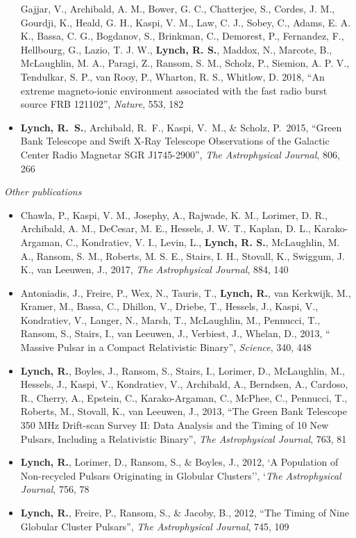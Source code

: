 \documentclass[10pt]{NSF}
\begin{document}
\begin{itemize}
{  Gajjar, V., Archibald, A. M., Bower, G. C., Chatterjee, S., Cordes,
  J. M., Gourdji, K., Heald, G. H., Kaspi, V. M., Law, C. J., Sobey,
  C., Adams, E. A. K., Bassa, C. G., Bogdanov, S., Brinkman, C.,
  Demorest, P., Fernandez, F., Hellbourg, G., Lazio, T. J. W.,
  \textbf{Lynch, R. S.}, Maddox, N., Marcote, B., McLaughlin, M. A.,
  Paragi, Z., Ransom, S. M., Scholz, P., Siemion, A. P. V., Tendulkar,
  S. P., van Rooy, P., Wharton, R. S., Whitlow, D. 2018, ``An extreme
  magneto-ionic environment associated with the fast radio burst
  source FRB 121102'', \emph{Nature}, 553, 182}
\item{\textbf{Lynch, R.~S.}, Archibald, R.~F., Kaspi, V.~M., \&
  Scholz, P.\ 2015, ``Green Bank Telescope and Swift X-Ray Telescope
  Observations of the Galactic Center Radio Magnetar SGR J1745-2900'',
  \emph{The Astrophysical Journal}, 806, 266}
\end{itemize}

\textit{Other publications}
\vspace{-1em}
\begin{itemize}
\item{Chawla, P., Kaspi, V. M., Josephy, A., Rajwade, K. M., Lorimer,
  D. R., Archibald, A. M., DeCesar, M. E., Hessels, J. W. T., Kaplan,
  D. L., Karako-Argaman, C., Kondratiev, V. I., Levin, L.,
  \textbf{Lynch, R. S.}, McLaughlin, M. A., Ransom, S. M., Roberts,
  M. S. E., Stairs, I. H., Stovall, K., Swiggum, J. K., van Leeuwen,
  J., 2017, \emph{The Astrophysical Journal}, 884, 140}
\item{Antoniadis, J., Freire, P., Wex, N., Tauris, T., \textbf{Lynch,
    R.}, van Kerkwijk, M., Kramer, M., Bassa, C., Dhillon, V., Driebe,
  T., Hessels, J., Kaspi, V., Kondratiev, V., Langer, N., Marsh, T.,
  McLaughlin, M., Pennucci, T., Ransom, S., Stairs, I., van Leeuwen,
  J., Verbiest, J., Whelan, D., 2013, `` Massive Pulsar in a Compact
  Relativistic Binary'', \emph{Science}, 340, 448}
\item{\textbf{Lynch, R.}, Boyles, J., Ransom, S., Stairs, I., Lorimer,
    D., McLaughlin, M., Hessels, J., Kaspi, V., Kondratiev, V.,
    Archibald, A., Berndsen, A., Cardoso, R., Cherry, A., Epstein, C.,
    Karako-Argaman, C., McPhee, C., Pennucci, T., Roberts, M.,
    Stovall, K., van Leeuwen, J., 2013, ``The Green Bank Telescope 350
    MHz Drift-scan Survey II: Data Analysis and the Timing of 10 New
    Pulsars, Including a Relativistic Binary'', \emph{The
      Astrophysical Journal}, 763, 81}
\item{\textbf{Lynch, R.}, Lorimer, D., Ransom, S., \& Boyles, J.,
  2012, `A Population of Non-recycled Pulsars Originating in Globular
  Clusters'', `\emph{The Astrophysical Journal}, 756, 78}
\item{\textbf{Lynch, R.}, Freire, P., Ransom, S., \& Jacoby, B., 2012,
  ``The Timing of Nine Globular Cluster Pulsars'', \emph{The
    Astrophysical Journal}, 745, 109}
\end{itemize}
\end{document}
